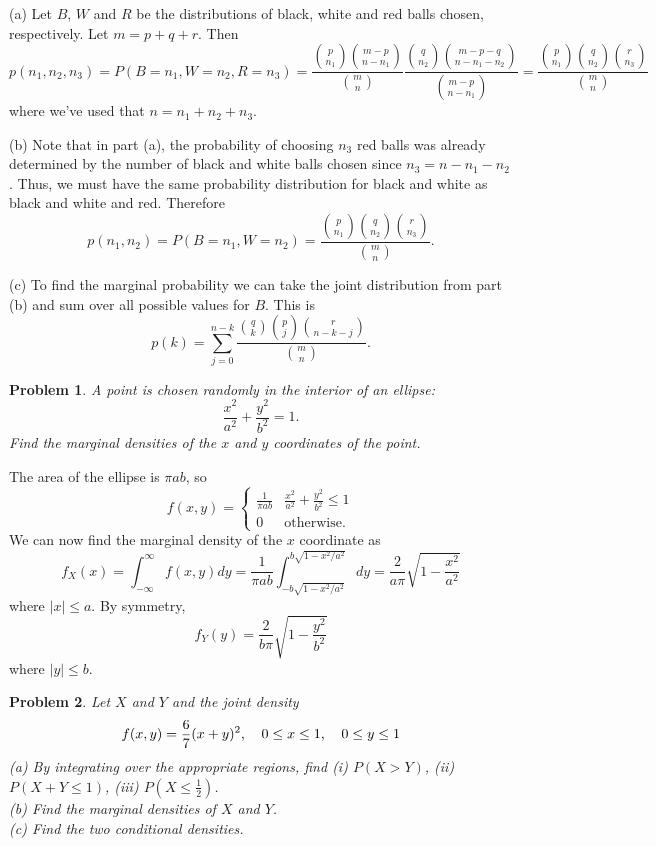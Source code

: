 \documentclass{article}
\newtheorem{problem}{Problem}
\begin{document}
(a) Let $B$, $W$ and $R$ be the distributions of black, white and red balls chosen, respectively. Let $m = p + q + r$. Then
\[
p(n_1, n_2, n_3) = P(B = n_1, W = n_2, R = n_3) = \frac{\binom{p}{n_1}\binom{m-p}{n-n_1}}{\binom{m}{n}} \frac{\binom{q}{n_2}\binom{m-p-q}{n-n_1-n_2}}{\binom{m-p}{n-n_1}} = \frac{\binom{p}{n_1}\binom{q}{n_2}\binom{r}{n_3}}{\binom{m}{n}}
\]
where we've used that $n = n_1 + n_2 + n_3$.

(b) Note that in part (a), the probability of choosing $n_3$ red balls was already determined by the number of black and white balls chosen since $n_3 = n - n_1 - n_2$. Thus, we must have the same probability distribution for black and white as black and white and red. Therefore
\[
p(n_1, n_2) = P(B = n_1, W = n_2) = \frac{\binom{p}{n_1}\binom{q}{n_2}\binom{r}{n_3}}{\binom{m}{n}}.
\]

(c) To find the marginal probability we can take the joint distribution from part (b) and sum over all possible values for $B$. This is
\[
p(k) = \sum_{j=0}^{n-k} \frac{\binom{q}{k}\binom{p}{j}\binom{r}{n-k-j}}{\binom{m}{n}}.
\]

\begin{problem}
A point is chosen randomly in the interior of an ellipse:
\[
\frac{x^2}{a^2} + \frac{y^2}{b^2} = 1.
\]
Find the marginal densities of the $x$ and $y$ coordinates of the point.
\end{problem}

The area of the ellipse is $\pi ab$, so
\[
f(x,y) =
\begin{cases}
\frac{1}{\pi ab} & \frac{x^2}{a^2} + \frac{y^2}{b^2} \leq 1\\
0 & \text{otherwise}.
\end{cases}
\]
We can now find the marginal density of the $x$ coordinate as
\[
f_X(x) = \int_{-\infty}^{\infty} f(x,y) dy = \frac{1}{\pi ab} \int_{-b \sqrt{1 - x^2/a^2}}^{b \sqrt{1 - x^2/a^2}} dy = \frac{2}{a \pi} \sqrt{1 - \frac{x^2}{a^2}}
\]
where $|x| \leq a$. By symmetry,
\[
f_Y(y) = \frac{2}{b \pi} \sqrt{1 - \frac{y^2}{b^2}}
\]
where $|y| \leq b$.

\begin{problem}
Let $X$ and $Y$ and the joint density
\[
\begin{tabular}{ccc}
$\displaystyle{f(x,y) = \frac{6}{7} (x+y)^2}$, & $\displaystyle{0 \leq x \leq 1}$, & $\displaystyle{0 \leq y \leq 1}$
\end{tabular}
\]
(a) By integrating over the appropriate regions, find (i) $P(X > Y)$, (ii) $P(X + Y \leq 1)$, (iii) $P(X \leq \frac{1}{2})$.\\
(b) Find the marginal densities of $X$ and $Y$.\\
(c) Find the two conditional densities.
\end{problem}
\end{document}
